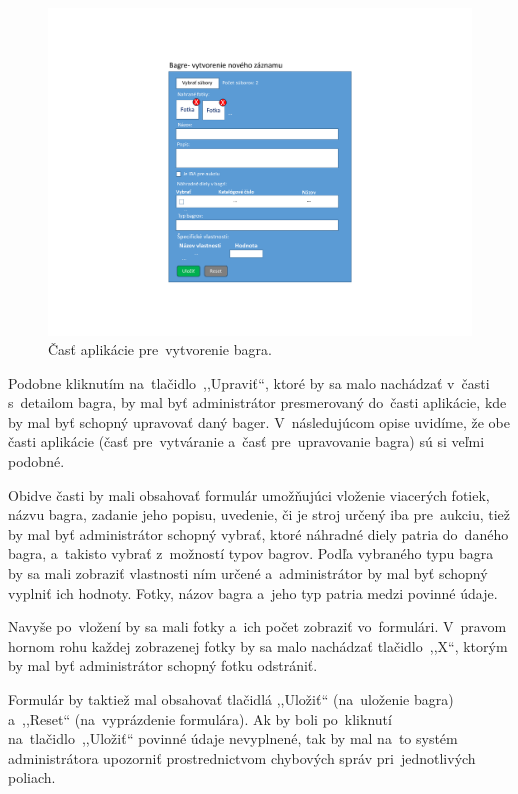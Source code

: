 \begin{figure}[H]\centering
\includegraphics[width=140mm]{../img/UI concept/excavator form}
\caption{Časť aplikácie pre~vytvorenie bagra.}
\label{excavator form}
\end{figure}

Podobne kliknutím na~tlačidlo~,,Upraviť``, ktoré by sa malo nachádzať v~časti s~detailom bagra, by mal byť administrátor presmerovaný do~časti aplikácie, kde by mal byť schopný upravovať daný bager. V~následujúcom opise uvidíme, že obe časti aplikácie (časť pre~vytváranie a~časť pre~upravovanie bagra) sú si veľmi podobné.

Obidve časti by mali obsahovať formulár umožňujúci vloženie viacerých fotiek, názvu bagra, zadanie jeho popisu, uvedenie, či je stroj určený iba pre~aukciu, tiež by mal byť administrátor schopný vybrať, ktoré náhradné diely patria do~daného bagra, a~takisto vybrať z~možností typov bagrov. Podľa vybraného typu bagra by sa mali zobraziť vlastnosti ním určené a~administrátor by mal byť schopný vyplniť ich hodnoty. Fotky, názov bagra a~jeho typ patria medzi povinné údaje.

Navyše po~vložení by sa mali fotky a~ich počet zobraziť vo~formulári. V~pravom hornom rohu každej zobrazenej fotky by sa malo nachádzať tlačidlo~,,X``, ktorým by mal byť administrátor schopný fotku odstrániť.

Formulár by taktiež mal obsahovať tlačidlá ,,Uložiť`` (na~uloženie bagra) a~,,Reset`` (na~vyprázdenie formulára). Ak by boli po~kliknutí na~tlačidlo~,,Uložiť`` povinné údaje nevyplnené, tak by mal na~to systém administrátora upozorniť prostrednictvom chybových správ pri~jednotlivých poliach.

